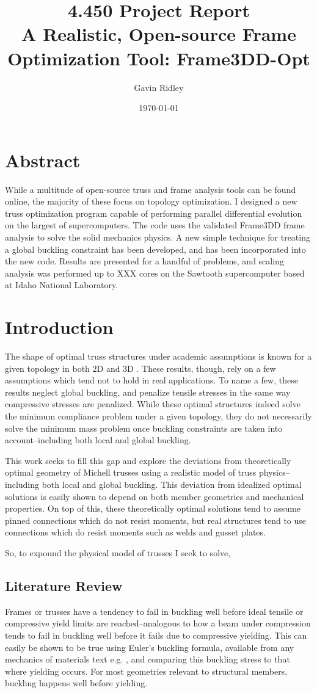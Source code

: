 \documentclass{report}
\author{Gavin Ridley}
\date{\today}
\title{4.450 Project Report\\ A Realistic, Open-source Frame Optimization Tool: Frame3DD-Opt}
\begin{document}
\section{Abstract}
While a multitude of open-source truss and frame analysis tools can be found online,
the majority of these focus on topology optimization. I designed a new truss optimization
program capable of performing parallel differential evolution on the largest of supercomputers.
The code uses the validated Frame3DD frame analysis to solve the solid mechanics physics.
A new simple technique for treating a global buckling constraint has been developed, and has
been incorporated into the new code. Results are presented for a handful of problems, and
scaling analysis was performed up to XXX cores on the Sawtooth supercomputer based at
Idaho National Laboratory.

\section{Introduction}
The shape of optimal truss structures under academic assumptions is known for a given
topology in both 2D \cite{} and 3D \cite{}. These results, though, rely on a few assumptions
which tend not to hold in real applications. To name a few, these results neglect global
buckling, and penalize tensile stresses in the same way compressive stresses are penalized.
While these optimal structures indeed solve the minimum compliance problem under a given
topology, they do not necessarily solve the minimum mass problem once buckling constraints
are taken into account--including both local and global buckling.

This work seeks to fill this gap and explore the deviations from theoretically optimal geometry
of Michell trusses using a realistic model of truss physics--including both local and global
buckling. This deviation from idealized optimal solutions is easily shown to depend on both
member geometries and mechanical properties. On top of this, these theoretically optimal
solutions tend to assume pinned connections which do not resist moments, but real structures
tend to use connections which do resist moments such as welds and gusset plates.

So, to expound the physical model of trusses I seek to solve, 

\subsection{Literature Review}
Frames or trusses have a tendency to fail in buckling well before ideal
tensile or compressive yield limits are reached--analogous to how a beam
under compression tends to fail in buckling well before it fails due to
compressive yielding. This can easily be shown to be true using Euler's
buckling formula, available from any mechanics of materials text e.g. \cite{gereMechanicsMaterials1996}, and
comparing this buckling stress to that where yielding occurs. For most
geometries relevant to structural members, buckling happens well before
yielding.
\end{document}
